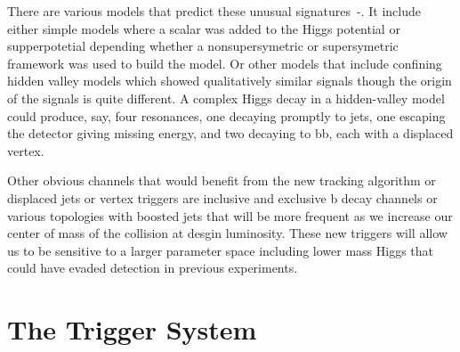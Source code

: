 \documentclass{JINST}
\begin{document}
There are various models that predict these unusual signatures~\cite{bib:hiddenvalley}-\cite{bib:HSV}. 
It include either simple models where a scalar was added to the Higgs potential or supperpotetial depending whether a nonsupersymetric
or supersymetric framework was used to build the model. 
Or other models that include conﬁning hidden valley models which showed qualitatively similar signals  though the origin of the signals is 
quite different.  A complex Higgs decay in a hidden-valley model could produce, say, four resonances, one decaying promptly to jets,
 one escaping the detector giving missing energy, and two decaying to bb, each with a displaced vertex.  

Other obvious channels that would benefit from the new tracking algorithm or displaced jets or vertex triggers are inclusive
and exclusive b decay channels or various topologies with boosted jets that will be more frequent as we increase our center of
mass of the collision at desgin luminosity. These new triggers will allow us to be sensitive to a larger  parameter space 
including lower mass Higgs that could have evaded detection  in previous experiments.

\section{The Trigger System}
%
\end{document}
